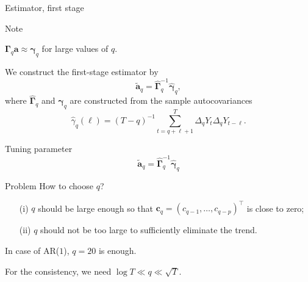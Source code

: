 \documentclass[10pt]{beamer}
\begin{document}
\begin{frame}{Estimator, first stage}

\begin{block}{Note}
\vspace{-3mm}
\begin{center}
$\boldsymbol{\Gamma}_q \boldsymbol{a} \approx \boldsymbol{\gamma}_q$ for large values of $q$.
\vspace{-3mm}
\end{center}\end{block}\pause

We construct the first-stage estimator by
\begin{equation*}
\widetilde{\boldsymbol{a}}_q = \widehat{\boldsymbol{\Gamma}}_q^{-1} \widehat{\boldsymbol{\gamma}}_q, 
\end{equation*}
where $\widehat{\boldsymbol{\Gamma}}_q$ and $\widehat{\boldsymbol{\gamma}}_q$ are constructed from the sample autocovariances $$\widehat{\gamma}_q(\ell) = (T-q)^{-1} \sum_{t=q+\ell+1}^T \Delta_q Y_{t} \Delta_q Y_{t-\ell}.$$ 
\end{frame}

\begin{frame}{Tuning parameter}
\begin{equation*}
\widetilde{\boldsymbol{a}}_q = \widehat{\boldsymbol{\Gamma}}_q^{-1} \widehat{\boldsymbol{\gamma}}_q 
\end{equation*}
\vspace{-3mm}
\begin{block}{Problem}
How to choose $q$?
\end{block}\pause
\vspace{-2mm}
\begin{itemize}
	\item[(i)] $q$ should be large enough so that $\boldsymbol{c}_q = (c_{q-1},\dots,c_{q-p})^\top$ is close to zero;\pause
	\item[(ii)] $q$ should not be too large to sufficiently eliminate the trend.
\end{itemize}\pause
In case of AR($1$), $q= 20$ is enough.\pause

For the consistency, we need $\log T \ll q \ll \sqrt{T}$.
\end{frame}
\end{document}
